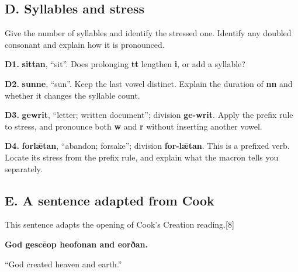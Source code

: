 \subsection*{D. Syllables and stress}

Give the number of syllables and identify the stressed one. Identify any doubled consonant and explain how it is pronounced.

\textbf{D1.} \textbf{sittan}, “sit”. Does prolonging \textbf{tt} lengthen \textbf{i}, or add a syllable?

\textbf{D2.} \textbf{sunne}, “sun”. Keep the last vowel distinct. Explain the duration of \textbf{nn} and whether it changes the syllable count.

\textbf{D3.} \textbf{gewrit}, “letter; written document”; division \textbf{ge-writ}. Apply the prefix rule to stress, and pronounce both \textbf{w} and \textbf{r} without inserting another vowel.

\textbf{D4.} \textbf{forlǣtan}, “abandon; forsake”; division \textbf{for-lǣtan}. This is a prefixed verb. Locate its stress from the prefix rule, and explain what the macron tells you separately.

\subsection*{E. A sentence adapted from Cook}

This sentence adapts the opening of Cook's Creation reading.[8]

\textbf{God gescēop heofonan and eorðan.}\par\nobreak

“God created heaven and earth.”

